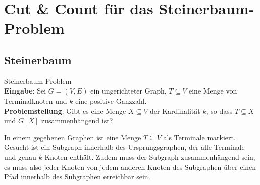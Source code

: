 %
%
%
\chapter{Cut \& Count für das Steinerbaum-Problem}
\label{c:cc_steiner}

\section{Steinerbaum}
\label{sec:steiner}
\begin{definition}
Steinerbaum-Problem\\
\textbf{Eingabe}: Sei $G = (V, E)$ ein ungerichteter Graph, $T \subseteq V$ eine Menge von Terminalknoten und $k$ eine positive Ganzzahl. \\
\textbf{Problemstellung}: Gibt es eine Menge $X \subseteq V$ der Kardinalität $k$, so dass $T \subseteq X$ und $G[X]$ zusammenhängend ist?
\end{definition}

In einem gegebenen Graphen ist eine Menge $T \subseteq V$ als Terminale markiert. Gesucht ist ein Subgraph innerhalb des Ursprungsgraphen, der alle Terminale und genau $k$ Knoten enthält. Zudem muss der Subgraph zusammenhängend sein, es muss also jeder Knoten von jedem anderen Knoten des Subgraphen über einen Pfad innerhalb des Subgraphen erreichbar sein.

